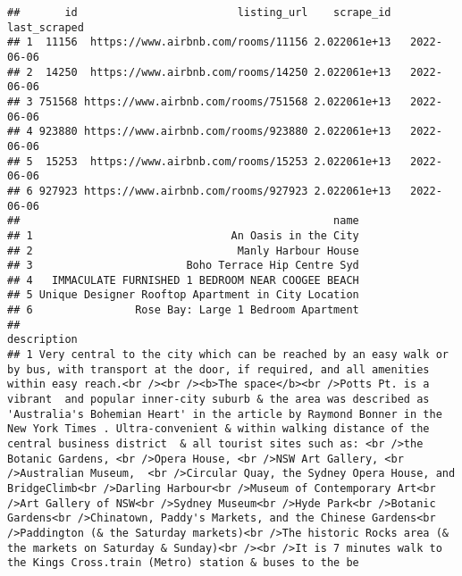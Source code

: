 \documentclass[
]{article}
\begin{document}
\begin{verbatim}
##       id                         listing_url    scrape_id last_scraped
## 1  11156  https://www.airbnb.com/rooms/11156 2.022061e+13   2022-06-06
## 2  14250  https://www.airbnb.com/rooms/14250 2.022061e+13   2022-06-06
## 3 751568 https://www.airbnb.com/rooms/751568 2.022061e+13   2022-06-06
## 4 923880 https://www.airbnb.com/rooms/923880 2.022061e+13   2022-06-06
## 5  15253  https://www.airbnb.com/rooms/15253 2.022061e+13   2022-06-06
## 6 927923 https://www.airbnb.com/rooms/927923 2.022061e+13   2022-06-06
##                                                 name
## 1                               An Oasis in the City
## 2                                Manly Harbour House
## 3                        Boho Terrace Hip Centre Syd
## 4   IMMACULATE FURNISHED 1 BEDROOM NEAR COOGEE BEACH
## 5 Unique Designer Rooftop Apartment in City Location
## 6                Rose Bay: Large 1 Bedroom Apartment
##                                                                                                                                                                                                                                                                                                                                                                                                                                                                                                                                                                                                                                                                                                                                                                                                                                                                                                                                                                                                                                description
## 1 Very central to the city which can be reached by an easy walk or by bus, with transport at the door, if required, and all amenities within easy reach.<br /><br /><b>The space</b><br />Potts Pt. is a vibrant  and popular inner-city suburb & the area was described as 'Australia's Bohemian Heart' in the article by Raymond Bonner in the New York Times . Ultra-convenient & within walking distance of the central business district  & all tourist sites such as: <br />the Botanic Gardens, <br />Opera House, <br />NSW Art Gallery, <br />Australian Museum,  <br />Circular Quay, the Sydney Opera House, and BridgeClimb<br />Darling Harbour<br />Museum of Contemporary Art<br />Art Gallery of NSW<br />Sydney Museum<br />Hyde Park<br />Botanic Gardens<br />Chinatown, Paddy's Markets, and the Chinese Gardens<br />Paddington (& the Saturday markets)<br />The historic Rocks area (& the markets on Saturday & Sunday)<br /><br />It is 7 minutes walk to the Kings Cross.train (Metro) station & buses to the be

\end{verbatim}
\end{document}

